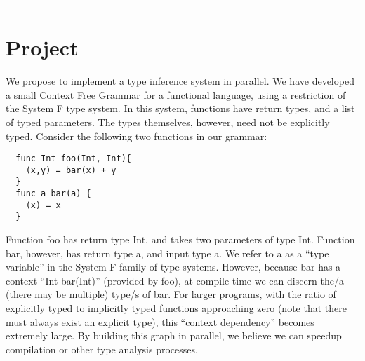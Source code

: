 \documentclass{article}[9pt]
\begin{document}
\thispagestyle{empty}
\noindent{}
\noindent{}

\vspace{1em}

\noindent{}
\rule{\textwidth}{1pt}

\section*{Project}
We propose to implement a type inference system in parallel. We have
developed a small Context Free Grammar for a functional language,
using a restriction of the System F type system. In this system,
functions have return types, and a list of typed parameters. The types
themselves, however, need not be explicitly typed. Consider the
following two functions in our grammar: 
\begin{lstlisting}
  func Int foo(Int, Int){
    (x,y) = bar(x) + y
  }
  func a bar(a) {
    (x) = x
  }
\end{lstlisting}
Function foo has return type Int, and takes two parameters of type
Int. Function bar, however, has return type a, and input type a. We
refer to a as a ``type variable'' in the System F family of type
systems. However, because bar has a context ``Int bar(Int)'' (provided
by foo), at compile time we can discern the/a  (there may be multiple)
type/s of bar. For larger programs, with the ratio of explicitly typed
to implicitly typed functions approaching zero (note that there must
always exist an explicit type), this ``context dependency'' becomes
extremely large. By building this graph in parallel, we believe we can
speedup compilation or other type analysis processes. 
\end{document}
